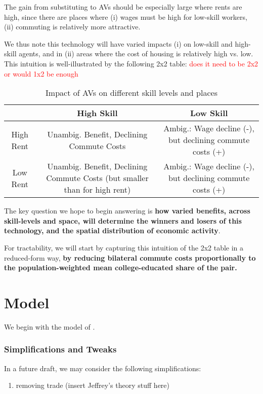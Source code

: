 \documentclass{article}
\begin{document}
The gain from substituting to AVs should be especially large where rents are high, since there are places where (i) wages must be high for low-skill workers, (ii) commuting  is relatively more attractive. 


We thus note this technology will have varied impacts (i) on low-skill and high-skill agents, and in (ii) areas where the cost of housing is relatively high vs. low.
This intuition is well-illustrated by the following 2x2 table: \textcolor{red}{does it need to be 2x2 or would 1x2 be enough}
\begin{table}[h!]
\centering
\begin{tabular}{|c|c|c|}
\hline
 & High Skill & Low Skill \\ \hline
High Rent & Unambig. Benefit, Declining Commute Costs & Ambig.:  Wage decline (-), but declining commute costs (+)   \\ \hline
Low Rent & Unambig. Benefit, Declining Commute Costs (but smaller than for high rent) & Ambig.:  Wage decline (-), but declining commute costs (+)   \\ \hline
\end{tabular}
\caption{Impact of AVs on different skill levels and places}
\label{tab:impact_avs}
\end{table}


The key question we hope to begin answering is \textbf{how varied benefits, across skill-levels and space, will determine the winners and losers of this technology, and the spatial distribution of economic activity}.

For tractability, we will start by capturing this intuition of the 2x2 table in a reduced-form way,  \textbf{by reducing bilateral commute costs proportionally to the population-weighted mean college-educated share of the pair. }


\section{Model}

We begin with the model of \citep{monte_commuting_2018}.




\subsubsection{Simplifications and Tweaks}

In a future draft, we may consider the following simplifications: 

\begin{enumerate}
\item removing trade (insert Jeffrey's theory stuff here)
\end{enumerate}
\end{document}
